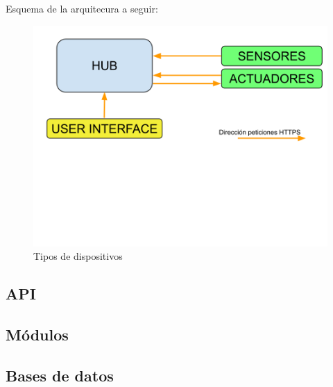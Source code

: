 Esquema de la arquitecura a seguir:
\begin{figure}[H]
\centering
\includegraphics[width=6.00in]{images/esquema_arquitectura.png}
\caption{Tipos de dispositivos}
\label{fig:descripcion_dispositivos}
\end{figure}

\subsection{API}

\subsection{Módulos}
\subsection{Bases de datos}


